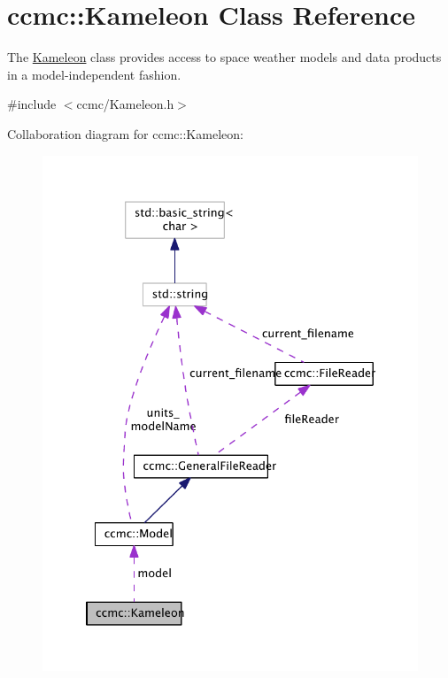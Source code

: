 \hypertarget{classccmc_1_1_kameleon}{\section{ccmc\-:\-:Kameleon Class Reference}
\label{classccmc_1_1_kameleon}
}


The \hyperlink{classccmc_1_1_kameleon}{Kameleon} class provides access to space weather models and data products in a model-\/independent fashion.  




{\ttfamily \#include $<$ccmc/\-Kameleon.\-h$>$}



Collaboration diagram for ccmc\-:\-:Kameleon\-:\nopagebreak
\begin{figure}[H]
\begin{center}
\leavevmode
\includegraphics[width=332pt]{classccmc_1_1_kameleon__coll__graph}
\end{center}
\end{figure}
